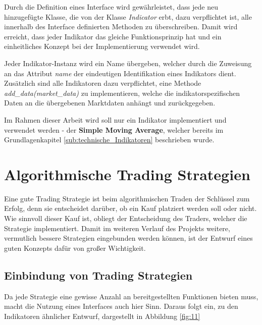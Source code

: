 \documentclass[oneside]{ausarbeitung}
\begin{document}
Durch die Definition eines Interface wird gewährleistet, dass jede neu hinzugefügte Klasse, die von der Klasse \textit{Indicator} erbt, dazu verpflichtet ist, alle innerhalb des Interface definierten Methoden zu überschreiben. Damit wird erreicht, dass jeder Indikator das gleiche Funktionsprinzip hat und ein einheitliches Konzept bei der Implementierung verwendet wird.

Jeder Indikator-Instanz wird ein Name übergeben, welcher durch die Zuweisung an das Attribut \textit{name} der eindeutigen Identifikation eines Indikators dient. Zusätzlich sind alle Indikatoren dazu verpflichtet, eine Methode \textit{add\_data(market\_data)} zu implementieren, welche die indikatorspezifischen Daten an die übergebenen Marktdaten anhängt und zurückgegeben.

Im Rahmen dieser Arbeit wird soll nur ein Indikator implementiert und verwendet werden - der \textbf{Simple Moving Average}, welcher bereits im Grundlagenkapitel \ref{sub:technische_Indikatoren} beschrieben wurde.


\section{Algorithmische Trading Strategien}
\label{sec:algorithmische_trading_strategien}

Eine gute Trading Strategie ist beim algorithmischen Traden der Schlüssel zum Erfolg, denn sie entscheidet darüber, ob ein Kauf platziert werden soll oder nicht. Wie sinnvoll dieser Kauf ist, obliegt der Entscheidung des Traders, welcher die Strategie implementiert. Damit im weiteren Verlauf des Projekts weitere, vermutlich bessere Strategien eingebunden werden können, ist der Entwurf eines guten Konzepts dafür von großer Wichtigkeit.

\subsection{Einbindung von Trading Strategien}
\label{sub:einbindung_von_trading_strategien}

Da jede Strategie eine gewisse Anzahl an bereitgestellten Funktionen bieten muss, macht die Nutzung eines Interfaces auch hier Sinn. Daraus folgt ein, zu den Indikatoren ähnlicher Entwurf, dargestellt in Abbildung \ref{fig:11}
\end{document}
